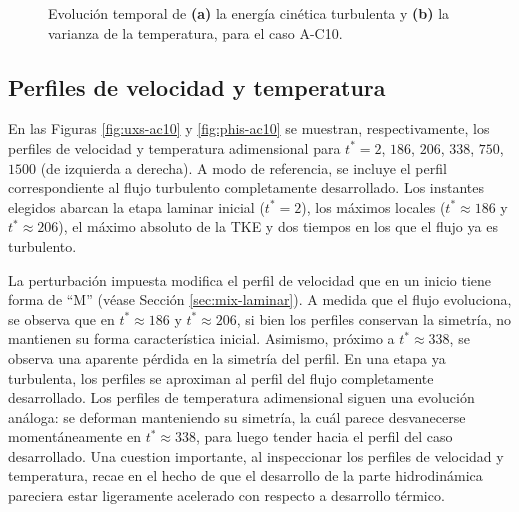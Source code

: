 \begin{figure}[H]
  \centering  
    
  \caption{Evolución temporal de \textbf{(a)} la energía cinética turbulenta y \textbf{(b)} la varianza de la temperatura, para el caso A-C10.}
  \label{fig:ac10-2}
\end{figure}

\subsection{Perfiles de velocidad y temperatura}

En las Figuras \ref{fig:uxs-ac10} y \ref{fig:phis-ac10} se muestran, respectivamente, los perfiles de velocidad y temperatura adimensional para $t^*=2$, $186$, $206$, $338$, $750$, $1500$ (de izquierda a derecha). A modo de referencia, se incluye el perfil correspondiente al flujo turbulento completamente desarrollado. Los instantes elegidos abarcan la etapa laminar inicial ($t^*=2$), los máximos locales ($t^* \approx 186$ y $t^* \approx 206$), el máximo absoluto de la TKE y dos tiempos en los que el flujo ya es turbulento.

La perturbación impuesta modifica el perfil de velocidad que en un inicio tiene forma de ``M'' (véase Sección \ref{sec:mix-laminar}). A medida que el flujo evoluciona, se observa que en $t^* \approx 186$ y $t^* \approx 206$, si bien los perfiles conservan la simetría, no mantienen su forma característica inicial. Asimismo, próximo a $t^* \approx 338$, se observa una aparente pérdida en la simetría del perfil. En una etapa ya turbulenta, los perfiles se aproximan al perfil del flujo completamente desarrollado. Los perfiles de temperatura adimensional siguen una evolución análoga: se deforman manteniendo su simetría, la cuál parece desvanecerse momentáneamente en $t^* \approx 338$, para luego tender hacia el perfil del caso desarrollado. Una cuestion importante, al inspeccionar los perfiles de velocidad y temperatura, recae en el hecho de que el desarrollo de la parte hidrodinámica pareciera estar ligeramente acelerado con respecto a desarrollo térmico.

